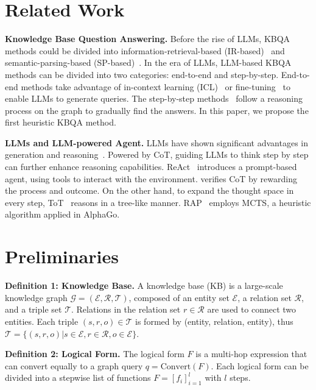 \documentclass{article}
\theoremstyle{plain}
\theoremstyle{definition}
\theoremstyle{remark}
\begin{document}
\section{Related Work}
\textbf{Knowledge Base Question Answering.} 
Before the rise of LLMs, KBQA methods could be divided into information-retrieval-based (IR-based)~\citep{GRAFT-Net, PullNet, SR} and semantic-parsing-based (SP-based)~\citep{RnG-KBQA, TIARA}. In the era of LLMs, LLM-based KBQA methods can be divided into two categories: end-to-end and step-by-step. End-to-end methods take advantage of in-context learning (ICL)~\citep{KB-BINDER,KB-Coder} or fine-tuning~\citep{RoG,ChatKBQA} to enable LLMs to generate queries. The step-by-step methods~\citep{Pangu, ToG, QueryAgent} follow a reasoning process on the graph to gradually find the answers. In this paper, we propose the first heuristic KBQA method.

\textbf{LLMs and LLM-powered Agent. }
LLMs have shown significant advantages in generation and reasoning~\cite{llmkg}. Powered by CoT\citep{CoT,CoTpower}, guiding LLMs to think step by step can further enhance reasoning capabilities. ReAct~\citep{ReAct} introduces a prompt-based agent, using tools to interact with the environment. \citet{prm} verifies CoT by rewarding the process and outcome. On the other hand, to expand the thought space in every step, ToT~\citep{ToT} reasons in a tree-like manner. RAP~\citep{RAP} employs MCTS, a heuristic algorithm applied in AlphaGo.


\section{Preliminaries}
\label{Section3}

\textbf{Definition 1: Knowledge Base. }
A knowledge base (KB) is a large-scale knowledge graph $\mathcal{G}=(\mathcal{E},\mathcal{R},\mathcal{T})$, composed of an entity set $\mathcal{E}$, a relation set $\mathcal{R}$, and a triple set $\mathcal{T}$. Relations in the relation set $r \in \mathcal{R}$ are used to connect two entities. Each triple $(s,r,o) \in \mathcal{T}$ is formed by (entity, relation, entity), thus $\mathcal{T}=\{(s,r,o)|s\in\mathcal{E},r\in\mathcal{R},o\in\mathcal{E}\}$.

\textbf{Definition 2: Logical Form. }
The logical form $F$ is a multi-hop expression that can convert equally to a graph query $q=\text{Convert}(F)$. 
Each logical form can be divided into a stepwise list of functions $F=[f_i]_{i=1}^l$ with $l$ steps. 
\end{document}
